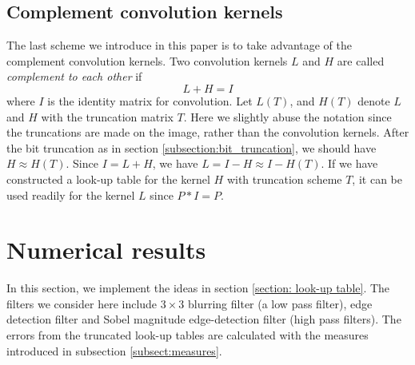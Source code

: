 \documentclass[12pt]{amsart}
\theoremstyle{definition}
\theoremstyle{remark}
\numberwithin{thm}{section}
\begin{document}
\subsection{Complement convolution kernels}
The last scheme we introduce in this paper is to take advantage of the complement convolution kernels. Two convolution kernels $L$ and $H$ are called \emph{complement to each other} if 
$$L+H=I$$
where $I$ is the identity matrix for convolution. Let $L(T)$, and $H(T)$ denote $L$ and $H$ with the truncation matrix $T$. Here we slightly abuse the notation since the truncations are made on the image, rather than the convolution kernels. After the bit truncation as in section \ref{subsection:bit_truncation}, we should have $H\approx H(T)$. Since $I = L + H$, we have $L = I - H \approx I - H(T)$. If we have constructed a look-up table for the kernel $H$ with truncation scheme $T$, it can be used readily for the kernel $L$ since $P*I=P$. 

\section{Numerical results}\label{section: numerical results}
In this section, we implement the ideas in section \ref{section: look-up table}. The filters we consider here include $3\times 3$ blurring filter (a low pass filter), edge detection filter and Sobel magnitude edge-detection filter (high pass filters). The errors from the truncated look-up tables are calculated with the measures introduced in subsection \ref{subsect:measures}. 
\end{document}
